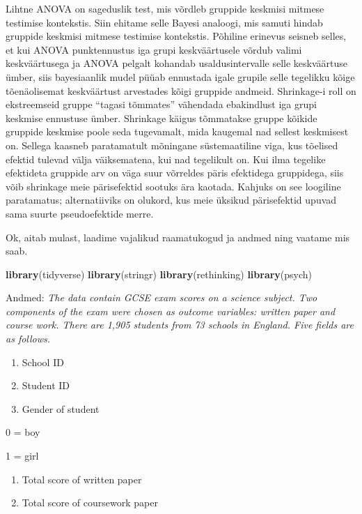 \documentclass[]{book}
\newenvironment{Shaded}{\begin{snugshade}}{\end{snugshade}}
\newcommand{\KeywordTok}[1]{\textcolor[rgb]{0.13,0.29,0.53}{\textbf{#1}}}
\newcommand{\NormalTok}[1]{#1}
\begin{document}
Lihtne ANOVA on sageduslik test, mis võrdleb gruppide keskmisi mitmese testimise kontekstis.
Siin ehitame selle Bayesi analoogi, mis samuti hindab gruppide keskmisi mitmese testimise kontekstis.
Põhiline erinevus seisneb selles, et kui ANOVA punktennustus iga grupi keskväärtusele võrdub valimi keskväärtusega ja ANOVA pelgalt kohandab usaldusintervalle selle keskväärtuse ümber, siis bayesiaanlik mudel püüab ennustada igale grupile selle tegelikku kõige tõenäolisemat keskväärtust arvestades kõigi gruppide andmeid.
Shrinkage-i roll on ekstreemseid gruppe ``tagasi tõmmates'' vähendada ebakindlust iga grupi keskmise ennustuse ümber.
Shrinkage käigus tõmmatakse gruppe kõikide gruppide keskmise poole seda tugevamalt, mida kaugemal nad sellest keskmisest on.
Sellega kaasneb paratamatult mõningane süstemaatiline viga, kus tõelised efektid tulevad välja väiksematena, kui nad tegelikult on.
Kui ilma tegelike efektideta gruppide arv on väga suur võrreldes päris efektidega gruppidega, siis võib shrinkage meie pärisefektid sootuks ära kaotada.
Kahjuks on see loogiline paratamatus; alternatiiviks on olukord, kus meie üksikud pärisefektid upuvad sama suurte pseudoefektide merre.

Ok, aitab mulast, laadime vajalikud raamatukogud ja andmed ning vaatame mis saab.

\begin{Shaded}
\begin{Highlighting}[]
\KeywordTok{library}\NormalTok{(tidyverse)}
\KeywordTok{library}\NormalTok{(stringr)}
\KeywordTok{library}\NormalTok{(rethinking)}
\KeywordTok{library}\NormalTok{(psych)}
\end{Highlighting}
\end{Shaded}

Andmed: \emph{The data contain GCSE exam scores on a science subject. Two components of the exam were chosen as outcome variables: written paper and course work. There are 1,905 students from 73 schools in England. Five fields are as follows.}

\begin{enumerate}
\def\labelenumi{\arabic{enumi}.}
\item
  School ID
\item
  Student ID
\item
  Gender of student
\end{enumerate}

0 = boy

1 = girl

\begin{enumerate}
\def\labelenumi{\arabic{enumi}.}
\setcounter{enumi}{3}
\item
  Total score of written paper
\item
  Total score of coursework paper
\end{enumerate}
\end{document}
